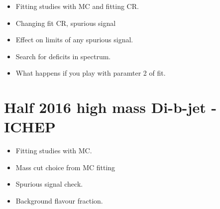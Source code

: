 \begin{itemize}
\item{Fitting studies with MC and fitting CR.}
\item{Changing fit CR, spurious signal}
\\
\item{Effect on limits of any spurious signal.}
\item{Search for deficits in spectrum.}
\item{What happens if you play with paramter 2 of fit.}
\\
\end{itemize}

\section{Half 2016 high mass Di-b-jet - ICHEP}

\begin{itemize}
\item{Fitting studies with MC.}
\item{Mass cut choice from MC fitting}
\item{Spurious signal check.}
\item{Background flavour fraction.}
\end{itemize}

\newpage
